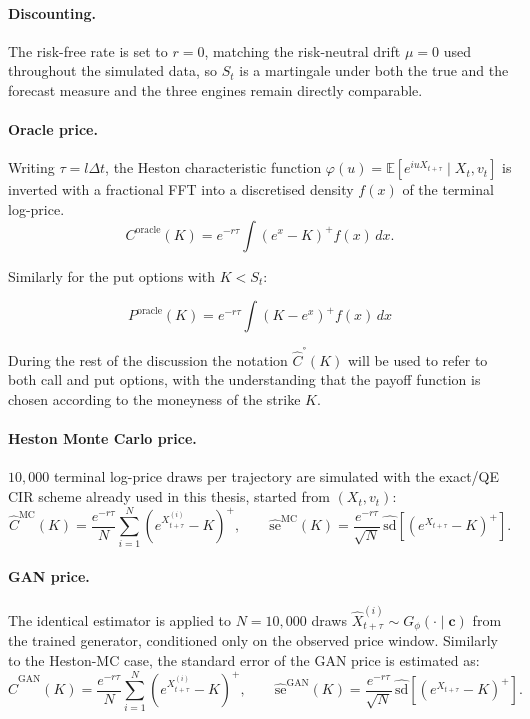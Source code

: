 \paragraph{Discounting.} The risk-free rate is set to $r=0$, matching the
risk-neutral drift $\mu=0$ used throughout the simulated data, so $S_t$
is a martingale under both the true and the forecast measure and the
three engines remain directly comparable.

\paragraph{Oracle price.} Writing $\tau=l\Delta t$, the Heston
characteristic function $\varphi(u)=\mathbb E[e^{iuX_{t+\tau}}\mid
X_t,v_t]$ is inverted with a fractional FFT into a discretised density
$f(x)$ of the terminal log-price.
\[
C^{\text{oracle}}(K)=e^{-r\tau}\int (e^{x}-K)^+ f(x)\,dx .
\]

Similarly for the put options with $K<S_t$:

\[
P^{\text{oracle}}(K)=e^{-r\tau}\int (K-e^{x})^+ f(x)\,dx
\]

During the rest of the discussion the notation $\hat C^{\text{°}}(K)$ will be used to refer to both call and put options, with the understanding that the payoff function is chosen according to the moneyness of the strike $K$.


\paragraph{Heston Monte Carlo price.} $10{,}000$ terminal log-price draws
per trajectory are simulated with the exact/QE CIR scheme already used
in this thesis, started from $(X_t,v_t)$:
\[
\hat C^{\text{MC}}(K)=\frac{e^{-r\tau}}{N}\sum_{i=1}^N
\left(e^{X_{t+\tau}^{(i)}}-K\right)^{+},\qquad
\widehat{\text{se}}^{\text{MC}}(K)=\frac{e^{-r\tau}}{\sqrt N}\,
\widehat{\mathrm{sd}}\!\left[\left(e^{X_{t+\tau}}-K\right)^{+}\right].
\]


\paragraph{GAN price.} The identical estimator is applied to $N=10{,}000$
draws $\hat X_{t+\tau}^{(i)}\sim G_\phi(\cdot\mid\mathbf c)$ from the
trained generator, conditioned only on the observed price window.
Similarly to the Heston-MC case, the standard error of the GAN price is estimated as:
\[
\hat C^{\text{GAN}}(K)=\frac{e^{-r\tau}}{N}\sum_{i=1}^N
\left(e^{X_{t+\tau}^{(i)}}-K\right)^{+},\qquad
\widehat{\text{se}}^{\text{GAN}}(K)=\frac{e^{-r\tau}}{\sqrt N}\,
\widehat{\mathrm{sd}}\!\left[\left(e^{X_{t+\tau}}-K\right)^{+}\right].
\]

